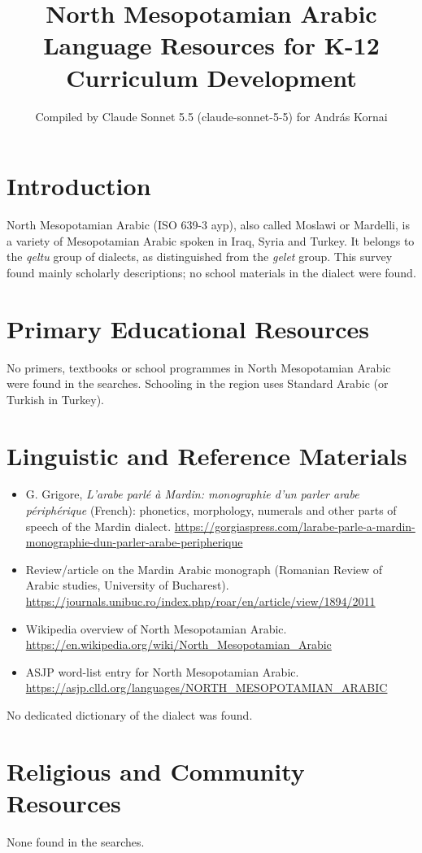 \documentclass[12pt]{article}
\title{North Mesopotamian Arabic Language Resources for K-12 Curriculum Development}
\author{Compiled by Claude Sonnet 5.5 (claude-sonnet-5-5) for Andr\'as Kornai}
\date{}
\begin{document}
\maketitle

\section{Introduction}
North Mesopotamian Arabic (ISO 639-3 ayp), also called Moslawi or Mardelli, is a variety of Mesopotamian Arabic spoken in Iraq, Syria and Turkey. It belongs to the \emph{qeltu} group of dialects, as distinguished from the \emph{gelet} group. This survey found mainly scholarly descriptions; no school materials in the dialect were found.

\section{Primary Educational Resources}
No primers, textbooks or school programmes in North Mesopotamian Arabic were found in the searches. Schooling in the region uses Standard Arabic (or Turkish in Turkey).

\section{Linguistic and Reference Materials}
\begin{itemize}
\item G. Grigore, \emph{L'arabe parl\'e \`a Mardin: monographie d'un parler arabe p\'eriph\'erique} (French): phonetics, morphology, numerals and other parts of speech of the Mardin dialect. \url{https://gorgiaspress.com/larabe-parle-a-mardin-monographie-dun-parler-arabe-peripherique}
\item Review/article on the Mardin Arabic monograph (Romanian Review of Arabic studies, University of Bucharest). \url{https://journals.unibuc.ro/index.php/roar/en/article/view/1894/2011}
\item Wikipedia overview of North Mesopotamian Arabic. \url{https://en.wikipedia.org/wiki/North_Mesopotamian_Arabic}
\item ASJP word-list entry for North Mesopotamian Arabic. \url{https://asjp.clld.org/languages/NORTH_MESOPOTAMIAN_ARABIC}
\end{itemize}
No dedicated dictionary of the dialect was found.

\section{Religious and Community Resources}
None found in the searches.
\end{document}
